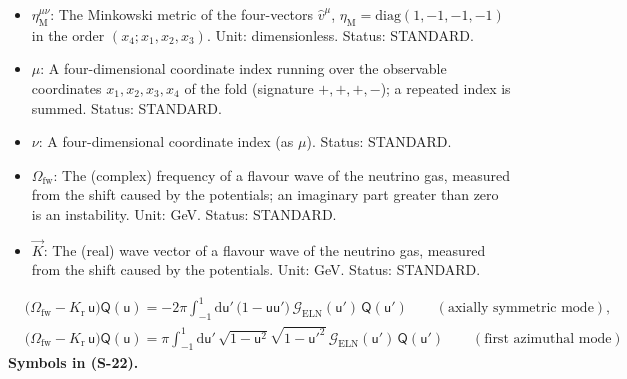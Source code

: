 \documentclass[
  10pt,
]{article}
\begin{document}
\begin{itemize}
  STANDARD.
\item
  \(\eta_{\mathrm{M}}^{\mu\nu}\): The Minkowski metric of the
  four-vectors \(\hat v^\mu\),
  \(\eta_{\mathrm{M}} = \mathrm{diag}(1, -1, -1, -1)\) in the order
  \((x_4; x_1, x_2, x_3)\). Unit: dimensionless. Status: STANDARD.
\item
  \(\mu\): A four-dimensional coordinate index running over the
  observable coordinates \(x_1, x_2, x_3, x_4\) of the fold (signature
  \(+,+,+,-\)); a repeated index is summed. Status: STANDARD.
\item
  \(\nu\): A four-dimensional coordinate index (as \(\mu\)). Status:
  STANDARD.
\item
  \(\Omega_{\mathrm{fw}}\): The (complex) frequency of a flavour wave of
  the neutrino gas, measured from the shift caused by the potentials; an
  imaginary part greater than zero is an instability. Unit: GeV. Status:
  STANDARD.
\item
  \(\vec K\): The (real) wave vector of a flavour wave of the neutrino
  gas, measured from the shift caused by the potentials. Unit: GeV.
  Status: STANDARD.
\end{itemize}

\[
\begin{aligned}
&\Big(\Omega_{\mathrm{fw}} - K_{\mathrm{r}}\,\mathsf{u}\Big)\mathsf{Q}(\mathsf{u}) = -2\pi\int_{-1}^{1}\mathrm{d}\mathsf{u}'\,\big(1 - \mathsf{u}\mathsf{u}'\big)\,\mathcal{G}_{\mathrm{ELN}}(\mathsf{u}')\,\mathsf{Q}(\mathsf{u}')\qquad(\text{axially symmetric mode}),\\
&\Big(\Omega_{\mathrm{fw}} - K_{\mathrm{r}}\,\mathsf{u}\Big)\mathsf{Q}(\mathsf{u}) = \pi\int_{-1}^{1}\mathrm{d}\mathsf{u}'\,\sqrt{1 - \mathsf{u}^2}\sqrt{1 - \mathsf{u}'^2}\,\mathcal{G}_{\mathrm{ELN}}(\mathsf{u}')\,\mathsf{Q}(\mathsf{u}')\qquad(\text{first azimuthal mode})
\end{aligned} \tag{S-22}
\] \textbf{Symbols in (S-22).}
\end{document}
